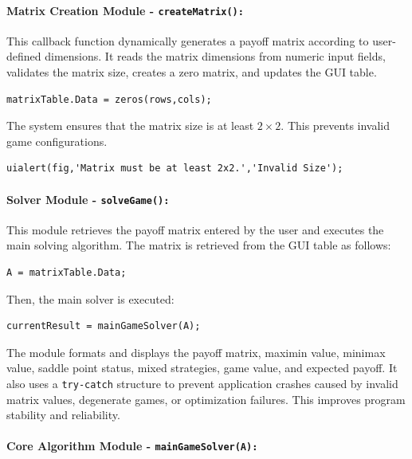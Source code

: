 \documentclass[12pt,a4paper]{article}
\begin{document}
\paragraph{Matrix Creation Module - \texttt{createMatrix():}}

This callback function dynamically generates a payoff matrix according to user-defined dimensions. It reads the matrix dimensions from numeric input fields, validates the matrix size, creates a zero matrix, and updates the GUI table.

\begin{lstlisting}[style=code]
matrixTable.Data = zeros(rows,cols);
\end{lstlisting}

The system ensures that the matrix size is at least \(2 \times 2\). This prevents invalid game configurations.

\begin{lstlisting}[style=code]
uialert(fig,'Matrix must be at least 2x2.','Invalid Size');
\end{lstlisting}

\paragraph{Solver Module - \texttt{solveGame():}}

This module retrieves the payoff matrix entered by the user and executes the main solving algorithm. The matrix is retrieved from the GUI table as follows:

\begin{lstlisting}[style=code]
A = matrixTable.Data;
\end{lstlisting}

Then, the main solver is executed:

\begin{lstlisting}[style=code]
currentResult = mainGameSolver(A);
\end{lstlisting}

The module formats and displays the payoff matrix, maximin value, minimax value, saddle point status, mixed strategies, game value, and expected payoff. It also uses a \texttt{try-catch} structure to prevent application crashes caused by invalid matrix values, degenerate games, or optimization failures. This improves program stability and reliability.

\paragraph{Core Algorithm Module - \texttt{mainGameSolver(A):}}
\end{document}
